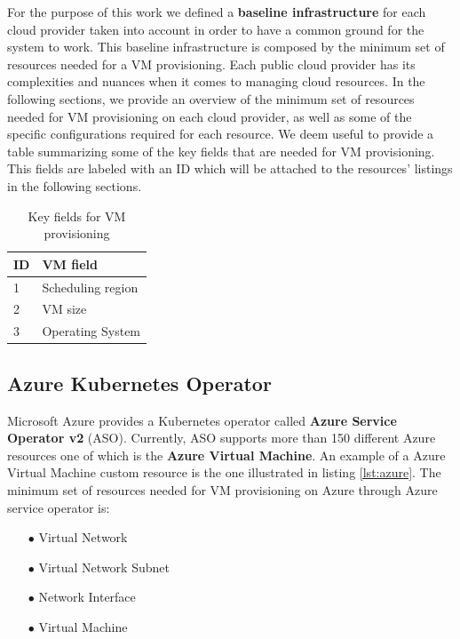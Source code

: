 For the purpose of this work we defined a \textbf{baseline infrastructure} for each cloud provider taken into account in order to have a common ground for the system to work. 
This baseline infrastructure is composed by the minimum set of resources needed for a VM provisioning.
Each public cloud provider has its complexities and nuances when it comes to managing cloud resources.
In the following sections, we provide an overview of the minimum set of resources needed for VM provisioning on each cloud provider, as well as some of the specific configurations required for each resource.
We deem useful to provide a table summarizing some of the key fields that are needed for VM provisioning.
This fields are labeled with an ID which will be attached to the resources' listings in the following sections.

\begin{table}[H]
  \centering
  \begin{tabular}{|l|l|}
  \hline
  \textbf{ID} & \textbf{VM field} \\ \hline
  1           & Scheduling region \\ \hline
  2           & VM size           \\ \hline
  3           & Operating System           \\ \hline
  \end{tabular}
  \caption{Key fields for VM provisioning}
  \label{tab:vm_fields}
\end{table}

\subsection{Azure Kubernetes Operator}

Microsoft Azure provides a Kubernetes operator called \textbf{Azure Service Operator v2} (ASO).
Currently, ASO supports more than 150 different Azure resources one of which is the \textbf{Azure Virtual Machine}.
An example of a Azure Virtual Machine custom resource is the one illustrated in listing \ref{lst:azure}.
The minimum set of resources needed for VM provisioning on Azure through Azure service operator is:

\begin{itemize}[itemsep=0.2pt, topsep=1pt] 
\item[$\bullet$] Virtual Network 
\item[$\bullet$] Virtual Network Subnet
\item[$\bullet$] Network Interface
\item[$\bullet$] Virtual Machine
\end{itemize}

